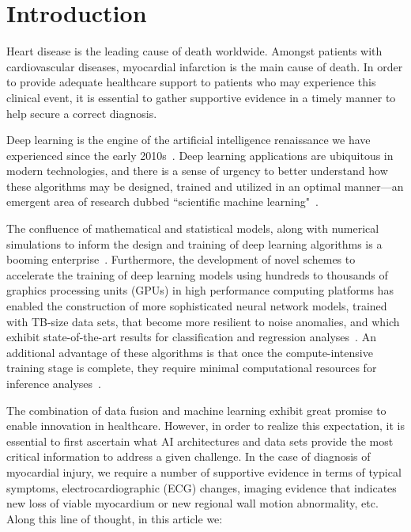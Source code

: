\documentclass{svproc}
\begin{document}
\section{Introduction}
Heart disease is the leading cause of death worldwide. Amongst patients with cardiovascular diseases, myocardial infarction is the main cause of death. In order to provide adequate healthcare support to patients who may experience this clinical event, it is essential to gather supportive evidence in a timely manner to help secure a correct diagnosis. 

Deep learning is the engine of the artificial intelligence renaissance we have experienced since the early 2010s~\cite{LeCun:Nature,SCHMIDHUBER201585}. Deep learning applications are ubiquitous in modern technologies, and there is a sense of urgency to better understand how these algorithms may be designed, trained and utilized in an optimal manner---an emergent area of research dubbed ``scientific machine learning"~\cite{doedl}.

The confluence of mathematical and statistical models, along with numerical simulations to inform the design and training of deep learning algorithms is a booming enterprise~\cite{maziar:DBLP,RAISSI2019686,Shen:2019vep,2019NatRP6}. Furthermore, the development of novel schemes to accelerate the training of deep learning models using hundreds to thousands of graphics processing units (GPUs) in high performance computing platforms has enabled the construction of more sophisticated neural network models, trained with TB-size data sets, that become more resilient to noise anomalies, and which exhibit state-of-the-art results for classification and regression analyses~\cite{eliu_nsf_dl,KHAN2019248,AIHPC,dglitcha:2017}. An additional advantage of these algorithms is that once the compute-intensive training stage is complete, they require minimal computational resources for inference analyses~\cite{Rebei:2018R,berg2018unified,Shen:ICASP2019,NIPS2016_6117,WEI2020135081,IsmailFawaz2019,geodf:2017a,geodf:2017b,AlvinC:2018,Dom:2018MNRAS,Dom:2018D,Dom:2018MNRAS,icecubenets,weistarclusters}. 
  
The combination of data fusion and machine learning exhibit great promise to enable innovation in healthcare. However, in order to realize this expectation, it is essential to first ascertain what AI architectures and data sets provide the most critical information to address a given challenge. In the case of diagnosis of myocardial injury, we require a number of supportive evidence in terms of typical symptoms, electrocardiographic (ECG) changes, imaging evidence that indicates new loss of viable myocardium or new regional wall motion abnormality, etc. Along this line of thought, in this article we:
\end{document}
